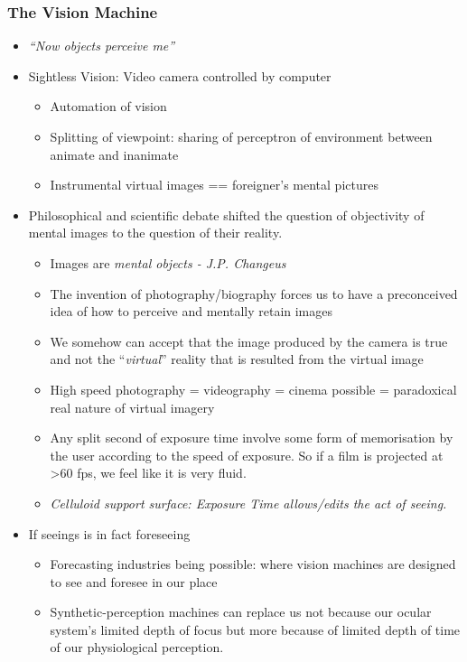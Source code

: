\documentclass[a4paper]{article}
\begin{document}
\subsubsection{The Vision Machine}
\begin{itemize}
	\item \textit{``Now objects perceive me''}
	\item Sightless Vision: Video camera controlled by computer
	\begin{itemize}[label=$\circ$]
		\item Automation of vision
		\item Splitting of viewpoint: sharing of perceptron of environment between animate and inanimate
		\item Instrumental virtual images == foreigner's mental pictures
	\end{itemize}
	\item Philosophical and scientific debate shifted the question of objectivity of mental images to the question of their reality.
	\begin{itemize}[label=$\circ$]
		\item Images are \textit{mental objects - J.P. Changeus}
		\item The invention of photography/biography forces us to have a preconceived idea of how to perceive and mentally retain images
		\item We somehow can accept that the image produced by the camera is true and not the ``\textit{virtual}'' reality that is resulted from the virtual image
		\item High speed photography =  videography = cinema possible = paradoxical real nature of virtual imagery
		\item Any split second of exposure time involve some form of memorisation by the user according to the speed of exposure. So if a film is projected at >60 fps, we feel like it is very fluid.
		\item \textit{Celluloid support surface: Exposure Time allows/edits the act of seeing.}
	\end{itemize}
	\item If seeings is in fact foreseeing
	\begin{itemize}[label=$\circ$]
		\item Forecasting industries being possible:  where vision machines are designed to see and foresee in our place
		\item Synthetic-perception machines can replace us not because our ocular system’s limited depth of focus but more because of limited depth of time of our physiological perception. 

\end{itemize}
\end{itemize}
\end{document}
